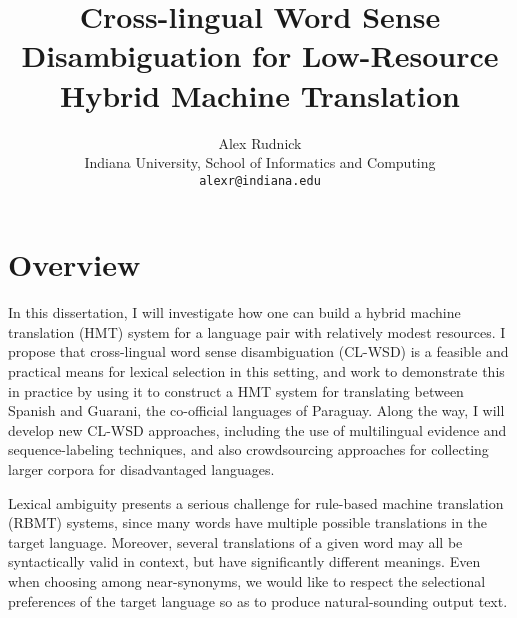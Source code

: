 \documentclass{article}
\title{Cross-lingual Word Sense Disambiguation for Low-Resource Hybrid Machine
Translation}
\author{Alex Rudnick \\
	    Indiana University, School of Informatics and Computing \\
	    {\tt alexr@indiana.edu}}
\date{}
\begin{document}
\maketitle



\section{Overview}


In this dissertation, I will investigate how one can build a hybrid machine
translation (HMT) system for a language pair with relatively modest resources.
I propose that cross-lingual word sense disambiguation (CL-WSD) is a
feasible and practical means for lexical selection in this setting, and work to
demonstrate this in practice by using it to construct a HMT system for
translating between Spanish and Guarani, the co-official languages of Paraguay.
Along the way, I will develop new CL-WSD approaches, including the use of
multilingual evidence and sequence-labeling techniques, and also crowdsourcing
approaches for collecting larger corpora for disadvantaged languages.

Lexical ambiguity presents a serious challenge for rule-based machine
translation (RBMT) systems, since many words have multiple possible
translations in the target language. Moreover, several translations of a given
word may all be syntactically valid in context, but have significantly
different meanings. Even when choosing among near-synonyms, we would like to
respect the selectional preferences of the target language so as to produce
natural-sounding output text.
\end{document}
